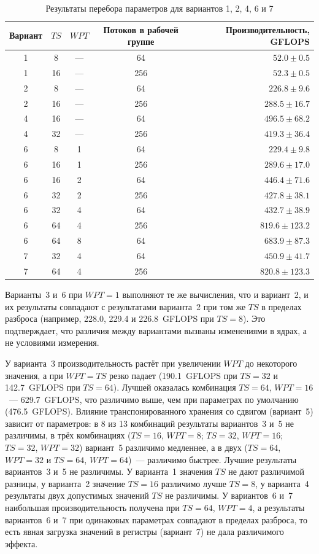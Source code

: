 \documentclass[a4paper]{article}
\begin{document}
\begin{table}[h!]
\centering
\caption{Результаты перебора параметров для вариантов 1, 2, 4, 6 и 7}
\label{tab:tuneother}
\begin{tabular}{c c c c r}
\toprule
Вариант & $TS$ & $WPT$ & Потоков в рабочей группе & Производительность, GFLOPS \\
\midrule
1 & 8  & --- & 64  & $52.0 \pm 0.5$ \\
1 & 16 & --- & 256 & $52.3 \pm 0.5$ \\
\midrule
2 & 8  & --- & 64  & $226.8 \pm 9.6$ \\
2 & 16 & --- & 256 & $288.5 \pm 16.7$ \\
\midrule
4 & 16 & --- & 64  & $496.5 \pm 68.2$ \\
4 & 32 & --- & 256 & $419.3 \pm 36.4$ \\
\midrule
6 & 8  & 1 & 64  & $229.4 \pm 9.8$ \\
6 & 16 & 1 & 256 & $289.6 \pm 17.0$ \\
6 & 16 & 2 & 64  & $446.4 \pm 71.6$ \\
6 & 32 & 2 & 256 & $427.8 \pm 38.1$ \\
6 & 32 & 4 & 64  & $432.7 \pm 38.9$ \\
6 & 64 & 4 & 256 & $819.6 \pm 123.2$ \\
6 & 64 & 8 & 64  & $683.9 \pm 87.3$ \\
\midrule
7 & 32 & 4 & 64  & $450.9 \pm 41.7$ \\
7 & 64 & 4 & 256 & $820.8 \pm 123.3$ \\
\bottomrule
\end{tabular}
\end{table}

Варианты~3 и~6 при $WPT=1$ выполняют те же вычисления, что и
вариант~2, и их результаты совпадают с результатами варианта~2 при том
же $TS$ в пределах разброса (например, 228.0, 229.4 и 226.8~GFLOPS при
$TS=8$). Это подтверждает, что различия между вариантами вызваны
изменениями в ядрах, а не условиями измерения.

У варианта~3 производительность растёт при увеличении $WPT$ до
некоторого значения, а при $WPT = TS$ резко падает (190.1~GFLOPS при
$TS=32$ и 142.7~GFLOPS при $TS=64$). Лучшей оказалась комбинация
$TS=64$, $WPT=16$~--- 629.7~GFLOPS, что различимо выше, чем при
параметрах по умолчанию (476.5~GFLOPS). Влияние транспонированного
хранения со сдвигом (вариант~5) зависит от параметров: в 8 из 13
комбинаций результаты вариантов~3 и~5 не различимы, в трёх
комбинациях ($TS=16$, $WPT=8$; $TS=32$, $WPT=16$; $TS=32$, $WPT=32$)
вариант~5 различимо медленнее, а в двух ($TS=64$, $WPT=32$ и
$TS=64$, $WPT=64$)~--- различимо быстрее. Лучшие результаты
вариантов~3 и~5 не различимы. У варианта~1 значения $TS$ не дают
различимой разницы, у варианта~2 значение $TS=16$ различимо лучше
$TS=8$, у варианта~4 результаты двух допустимых значений $TS$ не
различимы. У вариантов~6 и~7 наибольшая производительность получена
при $TS=64$, $WPT=4$, а результаты вариантов~6 и~7 при одинаковых
параметрах совпадают в пределах разброса, то есть явная загрузка
значений в регистры (вариант~7) не дала различимого эффекта.
\end{document}
